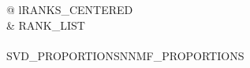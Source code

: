 \footnotesize
\begin{tabular}{@{\extracolsep{-5pt}} lRANKS_CENTERED} 
    \toprule {}\\
     & RANK_LIST\\\\
    SVD_PROPORTIONSNNMF_PROPORTIONS\bottomrule
\end{tabular}